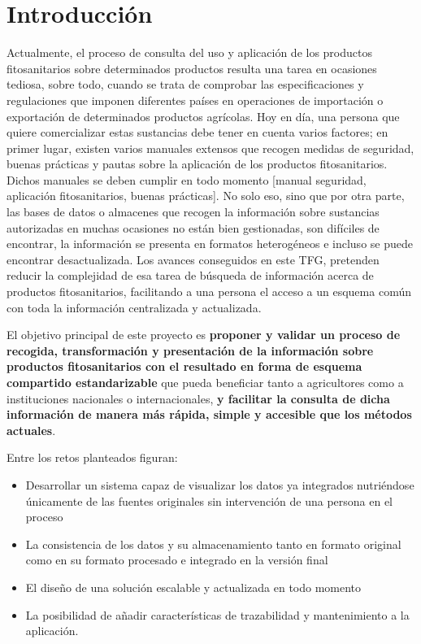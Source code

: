 \chapter{Introducción}
Actualmente, el proceso de consulta del uso y aplicación de los productos fitosanitarios sobre determinados productos resulta una tarea en ocasiones tediosa, sobre todo, cuando se trata de comprobar las especificaciones y regulaciones que imponen diferentes países en operaciones de importación o exportación de determinados productos agrícolas. Hoy en día, una persona que quiere comercializar estas sustancias debe tener en cuenta varios factores; en primer lugar, existen varios manuales extensos que recogen medidas de seguridad, buenas prácticas y pautas sobre la aplicación de los productos fitosanitarios. Dichos manuales se deben cumplir en todo momento [manual seguridad, aplicación fitosanitarios, buenas prácticas]. No solo eso, sino que por otra parte, las bases de datos o almacenes que recogen la información sobre sustancias autorizadas en muchas ocasiones no están bien gestionadas, son difíciles de encontrar, la información se presenta en formatos heterogéneos e incluso se puede encontrar desactualizada. Los avances conseguidos en este TFG, pretenden reducir la complejidad de esa tarea de búsqueda de información acerca de productos fitosanitarios, facilitando a una persona el acceso a un esquema común con toda la información centralizada y actualizada.\par

El objetivo principal de este proyecto es \textbf{proponer y validar un proceso de recogida, transformación y presentación de la información sobre productos fitosanitarios con el resultado en forma de esquema compartido estandarizable} que pueda beneficiar tanto a agricultores como a instituciones nacionales o internacionales, \textbf{y facilitar la consulta de dicha información de manera más rápida, simple y accesible que los métodos actuales}. \par
Entre los retos planteados figuran:
\begin{itemize}
\item Desarrollar un sistema capaz de visualizar los datos ya integrados nutriéndose únicamente de las fuentes originales sin intervención de una persona en el proceso
\item La consistencia de los datos y su almacenamiento tanto en formato original como en su formato procesado e integrado en la versión final
\item El diseño de una solución escalable y actualizada en todo momento
\item La posibilidad de añadir características de trazabilidad y mantenimiento a la aplicación.
\end{itemize}

